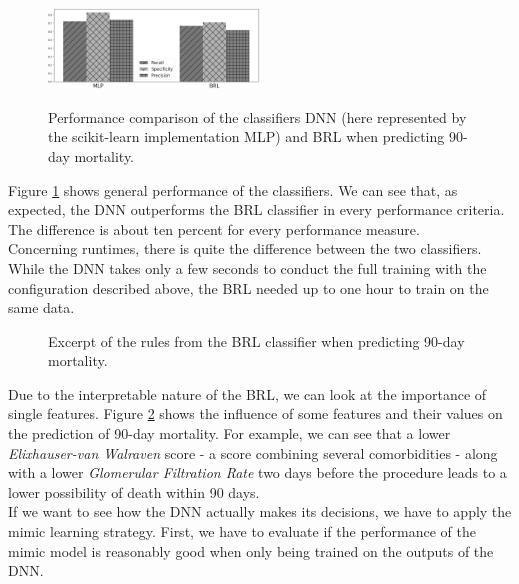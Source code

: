 \documentclass[conference,comsoc]{IEEEtran}
\begin{document}
\begin{figure}[h]
	\includegraphics[width=0.5\textwidth]{class_DIED_90DAYS.png}
	\label{fig:mortalityCLASS}
	\caption{Performance comparison of the classifiers DNN (here represented by the scikit-learn implementation MLP) and BRL when predicting 90-day mortality.}
\end{figure}

Figure \ref{fig:mortalityCLASS} shows general performance of the classifiers.
We can see that, as expected, the DNN outperforms the BRL classifier in every performance criteria.
The difference is about ten percent for every performance measure. \\
Concerning runtimes, there is quite the difference between the two classifiers.
While the DNN takes only a few seconds to conduct the full training with the configuration described above, the BRL needed up to one hour to train on the same data.

\begin{figure}[h]
	{
	\setlength{\fboxsep}{0pt}
	\setlength{\fboxrule}{1pt}
	}
	\label{fig:mortalityBRL}
	\caption{Excerpt of the rules from the BRL classifier when predicting 90-day mortality.}
\end{figure}

Due to the interpretable nature of the BRL, we can look at the importance of single features.
Figure \ref{fig:mortalityBRL} shows the influence of some features and their values on the prediction of 90-day mortality.
For example, we can see that a lower \emph{Elixhauser-van Walraven} score - a score combining several comorbidities - along with a lower \emph{Glomerular Filtration Rate} two days before the procedure leads to a lower possibility of death within 90 days. \\

If we want to see how the DNN actually makes its decisions, we have to apply the mimic learning strategy.
First, we have to evaluate if the performance of the mimic model is reasonably good when only being trained on the outputs of the DNN. \\
\end{document}

